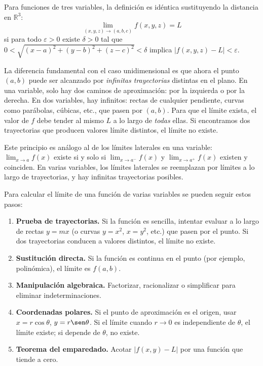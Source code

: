 \begin{rem}
Para funciones de tres variables, la definición es idéntica
sustituyendo la distancia en $\mathbb{R}^3$:
\[
\lim_{(x,y,z)\to(a,b,c)} f(x,y,z) = L
\]
si para todo $\varepsilon>0$ existe $\delta>0$ tal que
$0<\sqrt{(x-a)^2+(y-b)^2+(z-c)^2}<\delta$ implica
$|f(x,y,z)-L|<\varepsilon$.
\end{rem}

La diferencia fundamental con el caso unidimensional es que ahora el
punto $(a,b)$ puede ser alcanzado por \emph{infinitas trayectorias}
distintas en el plano. En una variable, solo hay dos caminos de
aproximación: por la izquierda o por la derecha. En dos variables,
hay infinitos: rectas de cualquier pendiente, curvas como parábolas,
cúbicas, etc., que pasen por $(a,b)$. Para que el límite exista, el
valor de $f$ debe tender al mismo $L$ a lo largo de \emph{todas}
ellas. Si encontramos dos trayectorias que producen valores límite
distintos, el límite no existe.

\begin{rem}
Este principio es análogo al de los límites laterales en una variable:
$\lim_{x\to a}f(x)$ existe si y solo si $\lim_{x\to a^-}f(x)$ y
$\lim_{x\to a^+}f(x)$ existen y coinciden. En varias variables, los
límites laterales se reemplazan por límites a lo largo de trayectorias,
y hay infinitas trayectorias posibles.
\end{rem}

\begin{pasos} Para calcular el límite de una función de varias variables se pueden seguir estos pasos:
\begin{enumerate}
    \item \textbf{Prueba de trayectorias.} Si la función es sencilla,
    intentar evaluar a lo largo de rectas $y=mx$ (o curvas $y=x^2$,
    $x=y^2$, etc.) que pasen por el punto. Si dos trayectorias
    conducen a valores distintos, el límite no existe.
    \item \textbf{Sustitución directa.} Si la función es continua en el
    punto (por ejemplo, polinómica), el límite es $f(a,b)$.
    \item \textbf{Manipulación algebraica.} Factorizar, racionalizar o
    simplificar para eliminar indeterminaciones.
    \item \textbf{Coordenadas polares.} Si el punto de aproximación es
    el origen, usar $x=r\cos\theta$, $y=r\sen\theta$. Si el límite
    cuando $r\to 0$ es independiente de $\theta$, el límite existe; si
    depende de $\theta$, no existe.
    \item \textbf{Teorema del emparedado.} Acotar $|f(x,y)-L|$ por
    una función que tiende a cero.
\end{enumerate}
\end{pasos}

